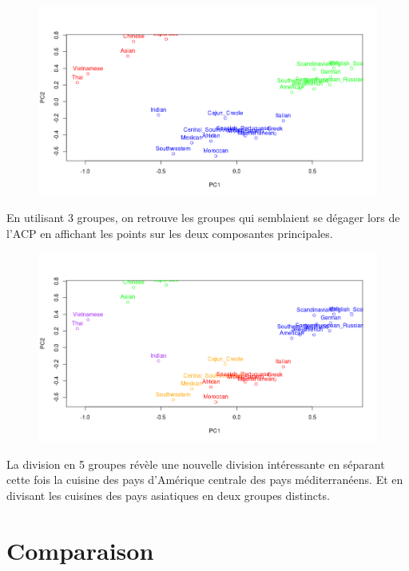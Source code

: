 \documentclass[a4paper, titlepage]{report}
\begin{document}
\begin{figure}[h]
	\begin{center}
		\includegraphics[scale = 0.32]{./doc/plot-kmeans-3.png}
	\end{center}
\end{figure}

En utilisant 3 groupes, on retrouve les groupes qui semblaient se dégager lors de l'ACP en affichant les points sur les deux composantes principales. 

\begin{figure}[h]
	\begin{center}
		\includegraphics[scale = 0.32]{./doc/plot-kmeans-5.png}
	\end{center}
\end{figure}

La division en 5 groupes révèle une nouvelle division intéressante en séparant cette fois la cuisine des pays d’Amérique centrale des pays méditerranéens. Et en divisant les cuisines des pays asiatiques en deux groupes distincts.


\section{Comparaison}
\end{document}
